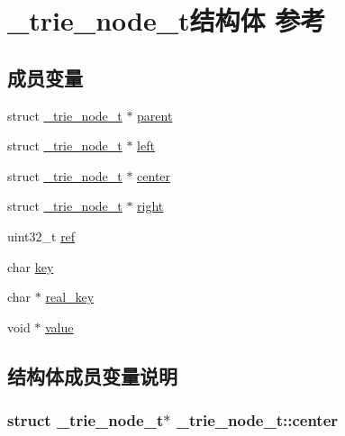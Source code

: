 \hypertarget{a00038}{}\section{\+\_\+trie\+\_\+node\+\_\+t结构体 参考}
\label{a00038}
\subsection*{成员变量}
\begin{DoxyCompactItemize}
\item 
struct \hyperlink{a00038}{\+\_\+trie\+\_\+node\+\_\+t} $\ast$ \hyperlink{a00038_a269a16af8b94efcc7cfe9b3f8ad458a7_a269a16af8b94efcc7cfe9b3f8ad458a7}{parent}
\item 
struct \hyperlink{a00038}{\+\_\+trie\+\_\+node\+\_\+t} $\ast$ \hyperlink{a00038_a19cd065aef056c66d5e8378b0c5e971a_a19cd065aef056c66d5e8378b0c5e971a}{left}
\item 
struct \hyperlink{a00038}{\+\_\+trie\+\_\+node\+\_\+t} $\ast$ \hyperlink{a00038_a1e4c95a35ea575423bfa010712fe9b19_a1e4c95a35ea575423bfa010712fe9b19}{center}
\item 
struct \hyperlink{a00038}{\+\_\+trie\+\_\+node\+\_\+t} $\ast$ \hyperlink{a00038_a7cb2c5153eaaa10e155682239595324d_a7cb2c5153eaaa10e155682239595324d}{right}
\item 
uint32\+\_\+t \hyperlink{a00038_a26621ad6d4899b4e5b15b927c32a7da5_a26621ad6d4899b4e5b15b927c32a7da5}{ref}
\item 
char \hyperlink{a00038_aaa9dc91660187f7dfed1d0f287c9d462_aaa9dc91660187f7dfed1d0f287c9d462}{key}
\item 
char $\ast$ \hyperlink{a00038_aa2491a4ef9d3da21a4695aa7abf2ef02_aa2491a4ef9d3da21a4695aa7abf2ef02}{real\+\_\+key}
\item 
void $\ast$ \hyperlink{a00038_a8c408bd6cb71843d24faf6b77f739c33_a8c408bd6cb71843d24faf6b77f739c33}{value}
\end{DoxyCompactItemize}


\subsection{结构体成员变量说明}
\hypertarget{a00038_a1e4c95a35ea575423bfa010712fe9b19_a1e4c95a35ea575423bfa010712fe9b19}{}
\subsubsection[{center}]{\setlength{\rightskip}{0pt plus 5cm}struct {\bf \+\_\+trie\+\_\+node\+\_\+t}$\ast$ \+\_\+trie\+\_\+node\+\_\+t\+::center}\label{a00038_a1e4c95a35ea575423bfa010712fe9b19_a1e4c95a35ea575423bfa010712fe9b19}
\hypertarget{a00038_aaa9dc91660187f7dfed1d0f287c9d462_aaa9dc91660187f7dfed1d0f287c9d462}{}
